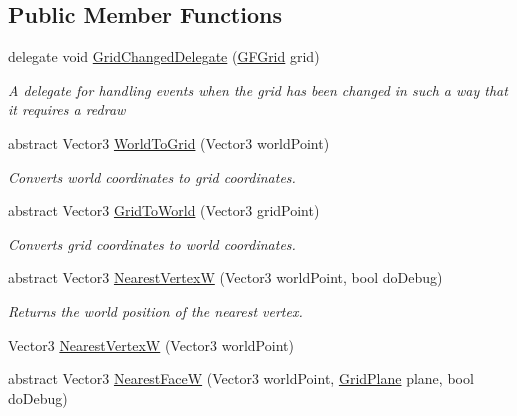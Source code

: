 \subsection*{Public Member Functions}
\begin{DoxyCompactItemize}
\item 
delegate void \hyperlink{class_g_f_grid_a1b011f573c51561fbd9e411f821ba820_a1b011f573c51561fbd9e411f821ba820}{Grid\+Changed\+Delegate} (\hyperlink{class_g_f_grid}{G\+F\+Grid} grid)
\begin{DoxyCompactList}\small\item\em A delegate for handling events when the grid has been changed in such a way that it requires a redraw\end{DoxyCompactList}\item 
abstract Vector3 \hyperlink{class_g_f_grid_a3c424ac71404a8c87a958b5b5952eb0f_a3c424ac71404a8c87a958b5b5952eb0f}{World\+To\+Grid} (Vector3 world\+Point)
\begin{DoxyCompactList}\small\item\em Converts world coordinates to grid coordinates.\end{DoxyCompactList}\item 
abstract Vector3 \hyperlink{class_g_f_grid_af32d7bfcecb5da3fdc47b972b551e33e_af32d7bfcecb5da3fdc47b972b551e33e}{Grid\+To\+World} (Vector3 grid\+Point)
\begin{DoxyCompactList}\small\item\em Converts grid coordinates to world coordinates.\end{DoxyCompactList}\item 
abstract Vector3 \hyperlink{class_g_f_grid_a5865880fa767bf5562301bca419b8bb9_a5865880fa767bf5562301bca419b8bb9}{Nearest\+Vertex\+W} (Vector3 world\+Point, bool do\+Debug)
\begin{DoxyCompactList}\small\item\em Returns the world position of the nearest vertex.\end{DoxyCompactList}\item 
Vector3 \hyperlink{class_g_f_grid_a5a5a2c1544b8f1665cd2ad64e68ad85a_a5a5a2c1544b8f1665cd2ad64e68ad85a}{Nearest\+Vertex\+W} (Vector3 world\+Point)
\item 
abstract Vector3 \hyperlink{class_g_f_grid_ae8711b08c90871f6e88800a30ff5077f_ae8711b08c90871f6e88800a30ff5077f}{Nearest\+Face\+W} (Vector3 world\+Point, \hyperlink{namespace_grid_framework_aa55de93079e09bd55c4cb660025820d5_aa55de93079e09bd55c4cb660025820d5}{Grid\+Plane} plane, bool do\+Debug)

\end{DoxyCompactItemize}

